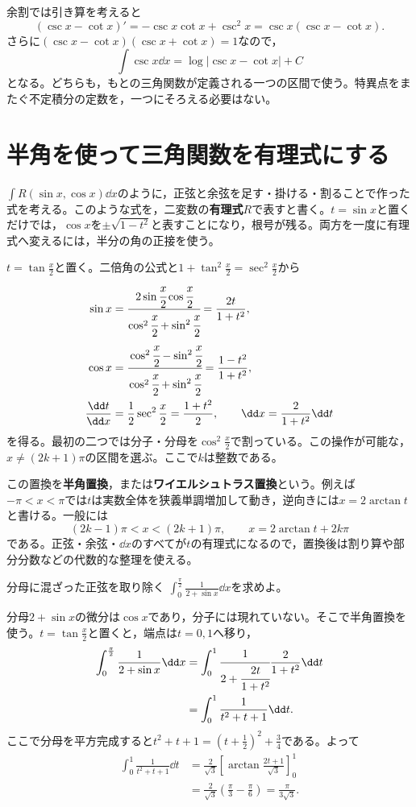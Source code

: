 余割では引き算を考えると
\[
(\csc x-\cot x)'=-\csc x\cot x+\csc^2x
=\csc x(\csc x-\cot x).
\]
さらに$(\csc x-\cot x)(\csc x+\cot x)=1$なので，
\[
\int\csc x\dd x=\log|\csc x-\cot x|+C
\]
となる。どちらも，もとの三角関数が定義される一つの区間で使う。特異点をまたぐ不定積分の定数を，一つにそろえる必要はない。

\section{半角を使って三角関数を有理式にする}\label{節:半角置換}

$\int R(\sin x,\cos x)\dd x$のように，正弦と余弦を足す・掛ける・割ることで作った式を考える。このような式を，二変数の\textbf{有理式}$R$で表すと書く。$t=\sin x$と置くだけでは，$\cos x$を$\pm\sqrt{1-t^2}$と表すことになり，根号が残る。両方を一度に有理式へ変えるには，半分の角の正接を使う。

$t=\tan\frac x2$と置く。二倍角の公式と$1+\tan^2\frac x2=\sec^2\frac x2$から
\begin{equation}\label{式:半角置換}
\begin{aligned}
\sin x&=\cfrac{2\sin\cfrac x2\cos\cfrac x2}
 {\cos^2\cfrac x2+\sin^2\cfrac x2}
 =\frac{2t}{1+t^2},\\
\cos x&=\cfrac{\cos^2\cfrac x2-\sin^2\cfrac x2}
 {\cos^2\cfrac x2+\sin^2\cfrac x2}
 =\frac{1-t^2}{1+t^2},\\
\frac{\dd t}{\dd x}&=\frac12\sec^2\frac x2
 =\frac{1+t^2}{2},\qquad
\dd x=\frac{2}{1+t^2}\dd t
\end{aligned}
\end{equation}
を得る。最初の二つでは分子・分母を$\cos^2\frac x2$で割っている。この操作が可能な，$x\ne(2k+1)\pi$の区間を選ぶ。ここで$k$は整数である。

この置換を\textbf{半角置換}，または\textbf{ワイエルシュトラス置換}という。例えば$-\pi<x<\pi$では$t$は実数全体を狭義単調増加して動き，逆向きには$x=2\arctan t$と書ける。一般には
\[
(2k-1)\pi<x<(2k+1)\pi,\qquad
x=2\arctan t+2k\pi
\]
である。正弦・余弦・$\dd x$のすべてが$t$の有理式になるので，置換後は割り算や部分分数などの代数的な整理を使える。

\begin{example}{分母に混ざった正弦を取り除く}
$\int_0^{\frac\pi2}\frac1{2+\sin x}\dd x$を求めよ。
\end{example}

分母$2+\sin x$の微分は$\cos x$であり，分子には現れていない。そこで半角置換を使う。$t=\tan\frac x2$と置くと，端点は$t=0,1$へ移り，
\[
\begin{aligned}
\int_0^{\frac\pi2}\frac1{2+\sin x}\dd x
&=\int_0^1\cfrac1{2+\cfrac{2t}{1+t^2}}
 \frac2{1+t^2}\dd t\\
&=\int_0^1\frac1{t^2+t+1}\dd t.
\end{aligned}
\]
ここで分母を平方完成すると$t^2+t+1=\left(t+\frac12\right)^2+\frac34$である。よって
\[
\begin{aligned}
\int_0^1\frac1{t^2+t+1}\dd t
&=\frac2{\sqrt3}\left[\arctan\frac{2t+1}{\sqrt3}\right]_0^1\\
&=\frac2{\sqrt3}\left(\frac\pi3-\frac\pi6\right)
=\frac\pi{3\sqrt3}.
\end{aligned}
\]

